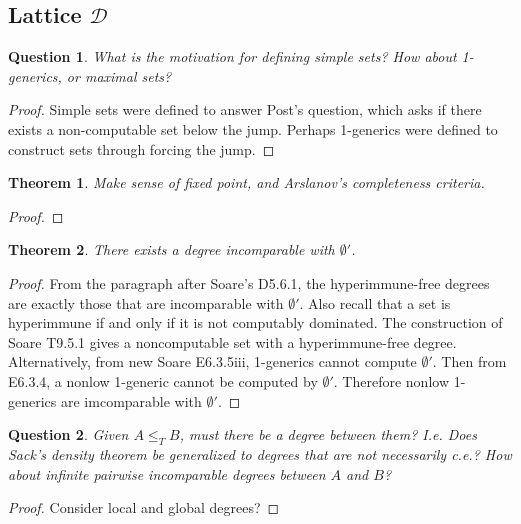 \documentclass{article}
\newtheorem{theorem}{Theorem}[subsection]
\newtheorem{question}{Question}[subsection]
\begin{document}
  \subsection{Lattice $\mathcal{D}$}
    \begin{question}
      What is the motivation for defining simple sets? How about
      1-generics, or maximal sets?
    \end{question}
    \begin{proof}
      Simple sets were defined to answer Post's question, which asks if
      there exists a non-computable set below the jump. Perhaps 1-generics
      were defined to construct sets through forcing the jump.
    \end{proof}

    \begin{theorem}
      Make sense of fixed point, and Arslanov's completeness criteria.
    \end{theorem}
    \begin{proof}
    \end{proof}

    \begin{theorem}
      There exists a degree incomparable with $\emptyset'$.
    \end{theorem}
    \begin{proof}
      From the paragraph after Soare's D5.6.1, the hyperimmune-free degrees
      are exactly those that are incomparable with $\emptyset'$. Also
      recall that a set is hyperimmune if and only if it is not computably
      dominated. The construction of Soare T9.5.1 gives a noncomputable set
      with a hyperimmune-free degree. \\

      Alternatively, from new Soare E6.3.5iii, 1-generics cannot compute
      $\emptyset'$. Then from E6.3.4, a nonlow 1-generic cannot be computed
      by $\emptyset'$. Therefore nonlow 1-generics are imcomparable with
      $\emptyset'$.
    \end{proof}

    \begin{question}
      Given $A\leq_T B$, must there be a degree between them? I.e. Does
      Sack's density theorem be generalized to degrees that are not
      necessarily c.e.? How about infinite pairwise incomparable degrees
      between $A$ and $B$?
    \end{question}
    \begin{proof}
      Consider local and global degrees?
    \end{proof}
\end{document}
